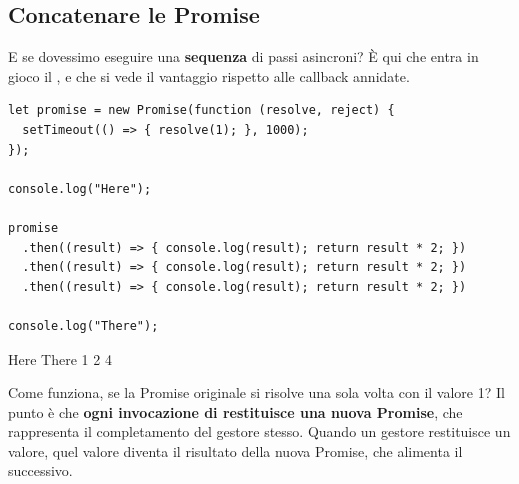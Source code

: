 \subsection{Concatenare le Promise}

E se dovessimo eseguire una \textbf{sequenza} di passi asincroni? È qui che
entra in gioco il , e che si vede il vantaggio rispetto
alle callback annidate.

\begin{affianco}[0.57][c]
\begin{lstlisting}[style=js, name=chaining.js]
let promise = new Promise(function (resolve, reject) {
  setTimeout(() => { resolve(1); }, 1000);
});

console.log("Here");

promise
  .then((result) => { console.log(result); return result * 2; })
  .then((result) => { console.log(result); return result * 2; })
  .then((result) => { console.log(result); return result * 2; })

console.log("There");
\end{lstlisting}
\risultato
\begin{immagine}
\end{immagine}
\begin{console}
Here
There
1
2
4
\end{console}
\end{affianco}

Come funziona, se la Promise originale si risolve una sola volta con il valore
1? Il punto è che \textbf{ogni invocazione di  restituisce una
nuova Promise}, che rappresenta il completamento del gestore stesso. Quando un
gestore restituisce un valore, quel valore diventa il risultato della nuova
Promise, che alimenta il  successivo.

